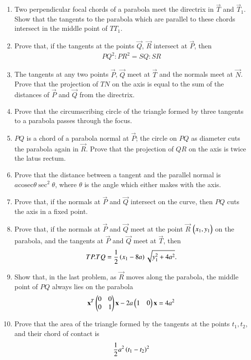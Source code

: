 \begin{enumerate}[label=\arabic*.,ref=\thesubsection.\theenumi]
\item Two perpendicular focal chords of a parabola meet the directrix in $\vec{T}$ and $\vec{T}_1$.
Show that the tangents to the parabola which are parallel to these chords intersect in the middle point of $TT_1$.
\item Prove that, if the tangents at the points $\vec{Q}$, $\vec{R}$ intersect at $\vec{P}$, then 
\begin{align}
PQ^2:PR^2=SQ:SR
\end{align}
\item The tangents at any two points $\vec{P}$, $\vec{Q}$ meet at $\vec{T}$ and the normals meet at $\vec{N}$.  Prove that the projection
of $TN$ on the axis is equal to the sum of the distances of $\vec{P}$ and $\vec{Q}$ from the directrix.
\item Prove that the circumscribing circle of the triangle formed by three tangents to a parabola
passes through the focus.
\item $PQ$ is a chord of a parabola normal at $\vec{P}$; the circle on $PQ$ as diameter cuts the parabola again in $\vec{R}$.  Prove that the projection
of $QR$ on the axis is twice the latus rectum.
\item Prove that the distance between a tangent and the parallel normal is $a\text{cosec}\theta\sec^2\theta$, where $\theta$ is the
angle which either makes with the axis.
\item Prove that, if the normals at $\vec{P}$ and $\vec{Q}$ intersect on the curve, then $PQ$ cuts the axis in
a fixed point.
\item Prove that, if the normals at $\vec{P}$ and $\vec{Q}$ meet at the point $\vec{R}$ $\begin{pmatrix}x_1,y_1\end{pmatrix}$ on the parabola, and the tangents at $\vec{P}$ and $\vec{Q}$
meet at $\vec{T}$, then
\begin{align}
TP.TQ=\frac{1}{2}\left(x_1-8a\right)\sqrt{y_1^2+4a^2}.
\end{align}
\item Show that, in the last problem, as $\vec{R}$ moves along the parabola, the middle point of $PQ$
always lies on the parabola
\begin{align}
\mathbf{x}^T\begin{pmatrix}0 & 0\\0 & 1\end{pmatrix}\mathbf{x}-2a\begin{pmatrix}1 & 0 \end{pmatrix}\mathbf{x}= 4a^2 
\end{align}
\item Prove that the area of the triangle formed by the tangents at the points $t_1,t_2$, and their chord of 
contact is
\begin{align}
\frac{1}{2}a^2\brak{t_1-t_2}^2

\end{align}
\end{enumerate}
